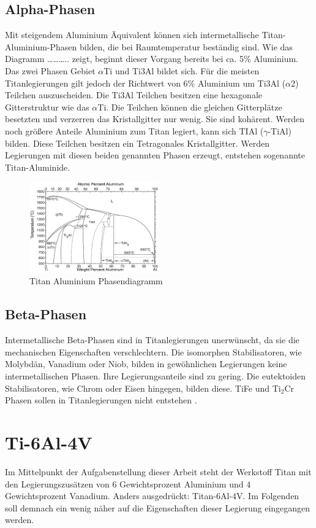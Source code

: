 \documentclass[a4paper, 11pt]{tubsreprt}
\begin{document}
\subsection{Alpha-Phasen}
Mit steigendem Aluminium Äquivalent können sich intermetallische Titan-Aluminium-Phasen bilden, die bei Raumtemperatur beständig sind. Wie das Diagramm ……….. zeigt, beginnt dieser Vorgang bereits bei ca. 5\% Aluminium. Das zwei Phasen Gebiet $\alpha$Ti und Ti3Al bildet sich. Für die meisten Titanlegierungen gilt jedoch der Richtwert von 6\% Aluminium um Ti3Al ($\alpha$2) Teilchen auszuscheiden.  Die Ti3Al Teilchen besitzen eine hexagonale Gitterstruktur wie das $\alpha$Ti. Die Teilchen können  die gleichen Gitterplätze besetzten und verzerren das Kristallgitter nur wenig. Sie sind kohärent.
Werden noch größere Anteile Aluminium  zum Titan legiert, kann sich TIAl ($\gamma$-TiAl) bilden. Diese Teilchen besitzen ein Tetragonales Kristallgitter.
Werden Legierungen mit diesen beiden genannten Phasen erzeugt, entstehen sogenannte Titan-Aluminide\cite{Luetjering2007}.   
\begin{figure}
\centering
\includegraphics[width=0.5\textwidth]{Bilder/Titanaluminide.png}
\caption{Titan Aluminium Phasendiagramm}
\end{figure}
 
\subsection{Beta-Phasen}
Intermetallische Beta-Phasen sind in Titanlegierungen unerwünscht, da sie die mechanischen Eigenschaften verschlechtern. Die isomorphen Stabilisatoren, wie Molybdän, Vanadium oder Niob, bilden in gewöhnlichen Legierungen keine intermetallischen Phasen. Ihre Legierungsanteile sind zu gering. Die eutektoiden Stabilisatoren, wie Chrom oder Eisen hingegen, bilden diese. TiFe und Ti$_{2}$Cr Phasen sollen in Titanlegierungen nicht entstehen \cite{Luetjering2007}.
\section{Ti-6Al-4V}\label{Kapitel ti64}
Im Mittelpunkt der Aufgabenstellung dieser Arbeit steht der Werkstoff Titan mit den Legierungszusätzen von 6 Gewichtsprozent Aluminium und 4 Gewichtsprozent Vanadium. Anders ausgedrückt: Titan-6Al-4V. Im Folgenden soll demnach ein wenig näher auf die Eigenschaften dieser Legierung eingegangen werden.  
\end{document}
